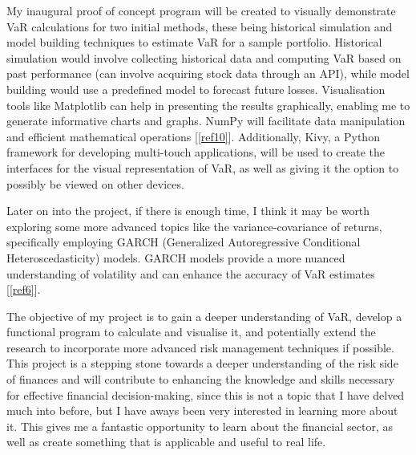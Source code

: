 \documentclass{article}
\begin{document}
My inaugural proof of concept program will be created to visually demonstrate VaR calculations for  two initial methods, these being historical simulation and model building techniques to estimate VaR for a sample portfolio. Historical simulation would involve collecting historical data and computing VaR based on past performance (can involve acquiring stock data through an API), while model building would use a predefined model to forecast future losses. Visualisation tools like Matplotlib can help in presenting the results graphically, enabling me to generate informative charts and graphs. NumPy will facilitate data manipulation and efficient mathematical operations [\ref{ref10}]. Additionally, Kivy, a Python framework for developing multi-touch applications, will be used to create the interfaces for the visual representation of VaR, as well as giving it the option to possibly be viewed on other devices.\\\vspace{0.3cm}

Later on into the project, if there is enough time, I think it may be worth exploring some more advanced topics like the variance-covariance of returns, specifically employing GARCH (Generalized Autoregressive Conditional Heteroscedasticity) models. GARCH models provide a more nuanced understanding of volatility and can enhance the accuracy of VaR estimates [\ref{ref6}].\\\vspace{0.3cm}

The objective of my project is to gain a deeper understanding of VaR, develop a functional program to calculate and visualise it, and potentially extend the research to incorporate more advanced risk management techniques if possible. This project is a stepping stone towards a deeper understanding of the risk side of finances and will contribute to enhancing the knowledge and skills necessary for effective financial decision-making, since this is not a topic that I have delved much into before, but I have aways been very interested in learning more about it. This gives me a fantastic opportunity to learn about the financial sector, as well as create something that is applicable and useful to real life. \\



\newpage
\end{document}
